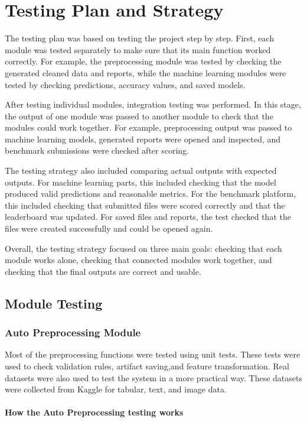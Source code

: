 \documentclass[12pt,a4paper]{report}
\begin{document}
\section{Testing Plan and Strategy}

The testing plan was based on testing the project step by step. First, each
module was tested separately to make sure that its main function worked
correctly. For example, the preprocessing module was tested by checking the
generated cleaned data and reports, while the machine learning modules were
tested by checking predictions, accuracy values, and saved models.

After testing individual modules, integration testing was performed. In this
stage, the output of one module was passed to another module to check that the
modules could work together. For example, preprocessing output was passed to
machine learning models, generated reports were opened and inspected, and
benchmark submissions were checked after scoring.

The testing strategy also included comparing actual outputs with expected
outputs. For machine learning parts, this included checking that the model
produced valid predictions and reasonable metrics. For the benchmark platform,
this included checking that submitted files were scored correctly and that the
leaderboard was updated. For saved files and reports, the test checked that the
files were created successfully and could be opened again.

Overall, the testing strategy focused on three main goals: checking that each
module works alone, checking that connected modules work together, and checking
that the final outputs are correct and usable.

\subsection{Module Testing}
\subsubsection{Auto Preprocessing Module}
Most of the preprocessing functions were tested using unit tests. These tests
were used to check validation rules, artifact saving,and feature transformation. Real datasets were also used to test the system in a
more practical way. These datasets were collected from Kaggle for tabular,
text, and image data.
\paragraph{How the Auto Preprocessing testing works}
\end{document}
